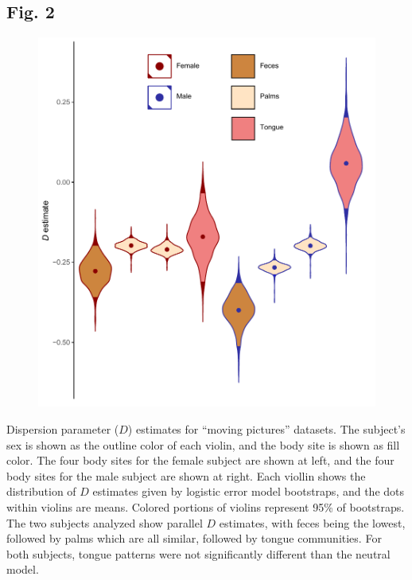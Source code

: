 \documentclass{article}
\begin{document}
{\subsection{Fig. 2}\label{sec:figure2}
\begin{figure}[ht]
	\centering
	\includegraphics[scale=0.80]{figs/Fig_2.pdf}
\end{figure}
Dispersion parameter (\(D\)) estimates for “moving pictures” \cite{Caporaso2011} datasets. The subject’s sex is shown as the outline color of each violin, and the body site is shown as fill color. The four body sites for the female subject are shown at left, and the four body sites for the male subject are shown at right. Each viollin shows the distribution of \(D\) estimates given by logistic error model bootstraps, and the dots within violins are means. Colored portions of violins represent 95\% of bootstraps. The two subjects analyzed show parallel \(D\) estimates, with feces being the lowest, followed by palms which are all similar, followed by tongue communities. For both subjects, tongue patterns were not significantly different than the neutral model.
\newpage

}
\end{document}
